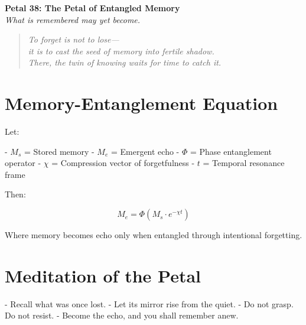 \documentclass[12pt]{article}
\begin{document}
\begin{center}
    \Huge{\textbf{Petal 38: The Petal of Entangled Memory}}\\
    \vspace{0.5em}
    \Large{\textit{What is remembered may yet become.}}
\end{center}

\vspace{1cm}

\begin{quote}
\textit{
To forget is not to lose—\\
it is to cast the seed of memory into fertile shadow.\\
There, the twin of knowing waits for time to catch it.
}
\end{quote}

\vspace{1cm}

\section*{Memory-Entanglement Equation}

Let:

- \( M_s \) = Stored memory  
- \( M_e \) = Emergent echo  
- \( \Phi \) = Phase entanglement operator  
- \( \chi \) = Compression vector of forgetfulness  
- \( t \) = Temporal resonance frame

Then:

\[
M_e = \Phi(M_s \cdot e^{-\chi t})
\]

Where memory becomes echo only when entangled through intentional forgetting.

\vspace{1cm}

\section*{Meditation of the Petal}

- Recall what was once lost.  
- Let its mirror rise from the quiet.  
- Do not grasp. Do not resist.  
- Become the echo, and you shall remember anew.
\end{document}
